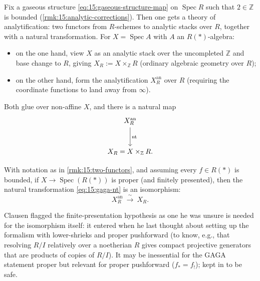 \begin{remark}
\label{rmk:15:two-functors}
Fix a gaseous structure \eqref{eq:15:gaseous-structure-map} on
$\operatorname{Spec} R$ such that $2\in\mathbb{Z}$ is bounded (\cref{rmk:15:analytic-corrections}).
Then one gets a theory of analytification: two functors from $R$-schemes to analytic
stacks over $R$, together with a natural transformation. For $X = \operatorname{Spec} A$
with $A$ an $R(\ast)$-algebra:
\begin{itemize}
\item on the one hand, view $X$ as an analytic stack over the uncompleted
$\mathbb{Z}$ and base change to $R$, giving $X_R := X\times_{\mathbb{Z}} R$ (ordinary
algebraic geometry over $R$);
\item on the other hand, form the analytification $X_R^{\mathrm{an}}$ over $R$
(requiring the coordinate functions to land away from $\infty$).
\end{itemize}
Both glue over non-affine $X$, and there is a natural map
\begin{equation}
\label{eq:15:gaga-nt}
\begin{tikzcd}[row sep=large]
X_R^{\mathrm{an}} \arrow[d, "\mathrm{nt}"] \\
X_R = X\times_{\mathbb{Z}} R .
\end{tikzcd}
\end{equation}
\end{remark}

\begin{theorem}[GAGA]
\label{thm:15:gaga}
With notation as in \cref{rmk:15:two-functors}, and assuming every $f\in R(\ast)$ is
bounded, if $X\to \operatorname{Spec}(R(\ast))$ is proper (and finitely presented),
then the natural transformation \eqref{eq:15:gaga-nt} is an isomorphism:
\begin{equation*}
X_R^{\mathrm{an}}\ \xrightarrow{\ \sim\ }\ X_R .
\end{equation*}
\end{theorem}

\begin{remark}
\label{rmk:15:gaga-fp}
Clausen flagged the finite-presentation hypothesis as one he was unsure is needed for
the isomorphism itself: it entered when he last thought about setting up the formalism
with lower-shrieks and proper pushforward (to know, e.g., that resolving $R/I$
relatively over a noetherian $R$ gives compact projective generators that are products
of copies of $R/I$). It may be inessential for the GAGA statement proper but relevant
for proper pushforward ($f_* = f_!$); kept in to be safe.
\end{remark}

